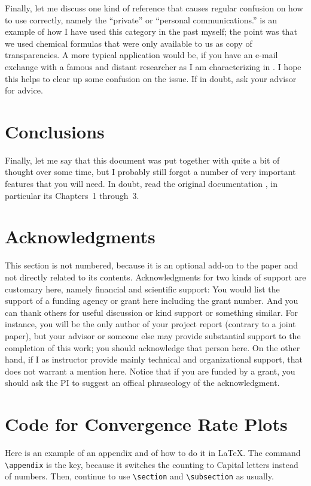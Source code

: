 \documentclass[12pt]{article}
\numberwithin{equation}{section}
\numberwithin{table}{section}
\numberwithin{figure}{section}
\begin{document}
Finally, let me discuss one kind of reference that causes regular
confusion on how to use correctly, namely the ``private'' or ``personal
communications.''
\cite{Ho95} is an example of how I have used this category in the past myself;
the point was that we used chemical formulas that were only
available to us as copy of transparencies. A more typical application
would be, if you have an e-mail exchange with a famous and distant researcher
as I am characterizing in \cite{BigShot}. I hope this helps to clear
up some confusion on the issue. If in doubt, ask your advisor for advice.

\section{Conclusions}

Finally, let me say that this document was put together with quite a bit
of thought over some time, but I probably still forgot a number of very
important features that you will need. In doubt, read the original
documentation \cite{Lamport94}, in particular its Chapters~1 through~3.

\section*{Acknowledgments}

This section is not numbered, because it is an optional add-on to the
paper and not directly related to its contents.
Acknowledgments for two kinds of support are customary here, namely
financial and scientific support: You would list the
support of a funding agency or grant here including the grant number.
And you can thank others for useful discussion or kind support or
something similar. For instance, you will be the only author of your
project report (contrary to a joint paper), but your advisor or
someone else may provide substantial support to the completion of
this work; you should acknowledge that person here. On the other hand,
if I as instructor provide mainly technical and organizational support,
that does not warrant a mention here.
Notice that if you are funded by a grant, you should ask the PI
to suggest an offical phraseology of the acknowledgment.
 
\appendix

\section{Code for Convergence Rate Plots} \label{appcode}

Here is an example of an appendix and of how to do it in \LaTeX.
The command \verb+\appendix+ is the key, because it switches the
counting to Capital letters instead of numbers. Then, continue to
use \verb+\section+ and \verb+\subsection+ as usually.





\end{document}
